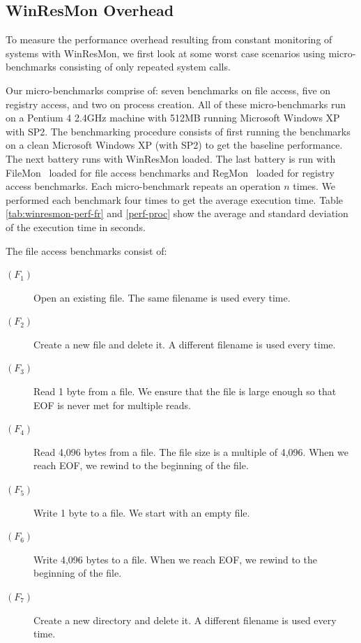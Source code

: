 \subsection{WinResMon Overhead}
\label{sec:resmon-overhead}

To measure the performance overhead resulting from constant
monitoring of systems with WinResMon,  we first look at some
worst case scenarios using micro-benchmarks consisting of only
repeated system calls.

Our micro-benchmarks comprise of: seven benchmarks on file access, five on registry access, and
two on process creation.  All of these micro-benchmarks run on a
Pentium 4 2.4GHz machine with 512MB running Microsoft Windows XP with SP2.
The benchmarking procedure consists of first running the benchmarks on a 
clean Microsoft Windows XP (with SP2) to get the baseline performance. The 
next battery runs with WinResMon loaded. The last battery is run with 
FileMon~\cite{filemon} loaded for file access benchmarks and RegMon~\cite{regmon} 
loaded for registry access benchmarks. Each micro-benchmark repeats an operation $n$ times. 
We performed each benchmark four times to get the average execution time.
Table \ref{tab:winresmon-perf-fr} and \ref{perf-proc} show the average and standard 
deviation of the execution time in seconds.

The file access benchmarks consist of:

\begin{description}
\item[$(F_1)$] Open an existing file.  The same filename is used every time.
\item[$(F_2)$] Create a new file and delete it.  A different filename is used
every time. 
\item[$(F_3)$] Read 1 byte from a file. We ensure that the file is large
enough so that EOF is never met for multiple reads.
\item[$(F_4)$] Read 4,096 bytes from a file.  The file size is a multiple of
4,096. When we reach EOF, we rewind to the beginning of the file.
\item[$(F_5)$] Write 1 byte to a file.  We start with an empty file.
\item[$(F_6)$] Write 4,096 bytes to a file.  When we reach EOF, we rewind to
the beginning of the file. 
\item[$(F_7)$] Create a new directory and delete it. A different filename is
used every time. 
\end{description}

